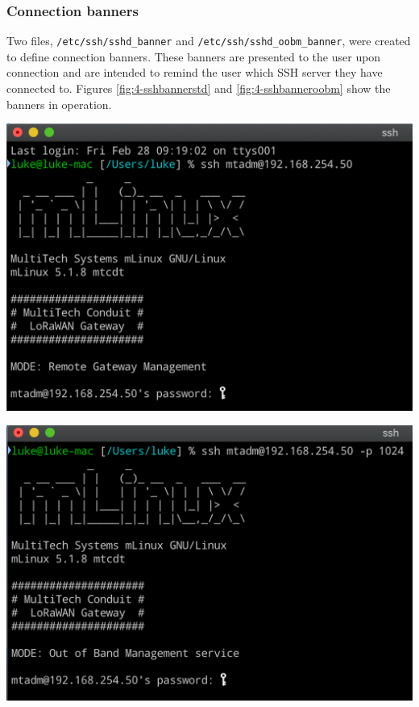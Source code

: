 \subsubsection{Connection banners}
\label{subsubsection:dev-sshdaemon-configuration-banners}
Two files, \verb|/etc/ssh/sshd_banner| and \verb|/etc/ssh/sshd_oobm_banner|, were created to define connection banners. These banners are presented to the user upon connection and are intended to remind the user which SSH server they have connected to. Figures \ref{fig:4-sshbannerstd} and \ref{fig:4-sshbanneroobm} show the banners in operation.
\begin{center}
    \begin{minipage}{.5\textwidth}
        \includegraphics[scale=0.4]{img/4-development/ssh-std-prompt.png}
        \label{fig:4-sshbannerstd}
    \end{minipage}
    \begin{minipage}{.4\textwidth}
        \includegraphics[scale=0.4]{img/4-development/ssh-oobm-prompt.png}
        \label{fig:4-sshbanneroobm}
    \end{minipage}
\end{center}
